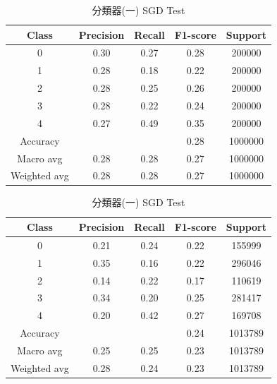\begin{enumerate}
        \begin{table}[H]
        \centering
        \scriptsize
        \begin{minipage}{0.48\textwidth}
        \centering
        \begin{tabular}{c|cccc}
        \hline
        Class & Precision & Recall & F1-score & Support \\
        \hline
        0 & 0.30 & 0.27 & 0.28 & 200000 \\
        1 & 0.28 & 0.18 & 0.22 & 200000 \\
        2 & 0.28 & 0.25 & 0.26 & 200000 \\
        3 & 0.28 & 0.22 & 0.24 & 200000 \\
        4 & 0.27 & 0.49 & 0.35 & 200000 \\
        \hline
        Accuracy &       &      & 0.28 & 1000000 \\
        Macro avg & 0.28 & 0.28 & 0.27 & 1000000 \\
        Weighted avg & 0.28 & 0.28 & 0.27 & 1000000 \\
        \hline
        \end{tabular}
        \caption{分類器(一) SGD Train}
        \label{tab:classifier_1_report_train_sgd_non_filtered}
        \end{minipage}%
        \hfill
        \begin{minipage}{0.48\textwidth}
        \centering
        \begin{tabular}{c|cccc}
        \hline
        Class & Precision & Recall & F1-score & Support \\
        \hline
        0 & 0.21 & 0.24 & 0.22 & 155999 \\
        1 & 0.35 & 0.16 & 0.22 & 296046 \\
        2 & 0.14 & 0.22 & 0.17 & 110619 \\
        3 & 0.34 & 0.20 & 0.25 & 281417 \\
        4 & 0.20 & 0.42 & 0.27 & 169708 \\
        \hline
        Accuracy &       &      & 0.24 & 1013789 \\
        Macro avg & 0.25 & 0.25 & 0.23 & 1013789 \\
        Weighted avg & 0.28 & 0.24 & 0.23 & 1013789 \\
        \hline
        \end{tabular}
        \caption{分類器(一) SGD Test}
        \label{tab:classifier_1_report_test_sgd_non_filtered}
        \end{minipage}
        \end{table}


\end{enumerate}
